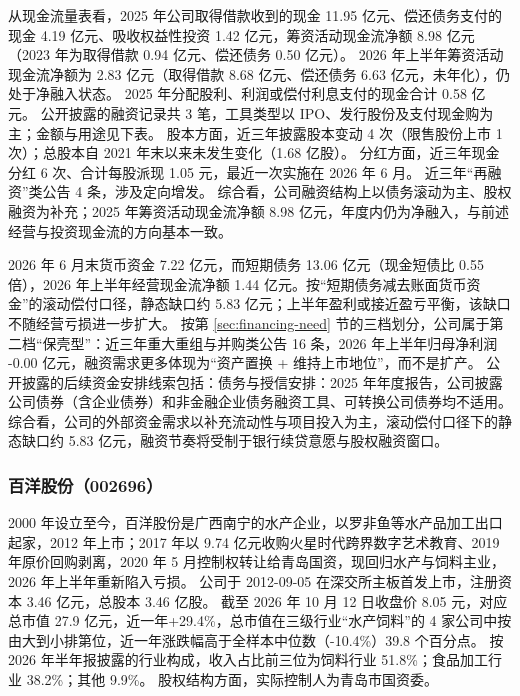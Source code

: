  从现金流量表看，2025 年公司取得借款收到的现金 11.95 亿元、偿还债务支付的现金 4.19 亿元、吸收权益性投资 1.42 亿元，筹资活动现金流净额 8.98 亿元（2023 年为取得借款 0.94 亿元、偿还债务 0.50 亿元）。 2026 年上半年筹资活动现金流净额为 2.83 亿元（取得借款 8.68 亿元、偿还债务 6.63 亿元，未年化），仍处于净融入状态。 2025 年分配股利、利润或偿付利息支付的现金合计 0.58 亿元。 公开披露的融资记录共 3 笔，工具类型以 IPO、发行股份及支付现金购为主；金额与用途见下表。 股本方面，近三年披露股本变动 4 次（限售股份上市 1 次）；总股本自 2021 年末以来未发生变化（1.68 亿股）。 分红方面，近三年现金分红 6 次、合计每股派现 1.05 元，最近一次实施在 2026 年 6 月。 近三年“再融资”类公告 4 条，涉及定向增发。 综合看，公司融资结构上以债务滚动为主、股权融资为补充；2025 年筹资活动现金流净额 8.98 亿元，年度内仍为净融入，与前述经营与投资现金流的方向基本一致。

 2026 年 6 月末货币资金 7.22 亿元，而短期债务 13.06 亿元（现金短债比 0.55 倍），2026 年上半年经营现金流净额 1.44 亿元。按“短期债务减去账面货币资金”的滚动偿付口径，静态缺口约 5.83 亿元；上半年盈利或接近盈亏平衡，该缺口不随经营亏损进一步扩大。 按第 \ref{sec:financing-need} 节的三档划分，公司属于第二档“保壳型”：近三年重大重组与并购类公告 16 条，2026 年上半年归母净利润 -0.00 亿元，融资需求更多体现为“资产置换 + 维持上市地位”，而不是扩产。 公开披露的后续资金安排线索包括：债务与授信安排：2025 年年度报告，公司披露公司债券（含企业债券）和非金融企业债务融资工具、可转换公司债券均不适用。 综合看，公司的外部资金需求以补充流动性与项目投入为主，滚动偿付口径下的静态缺口约 5.83 亿元，融资节奏将受制于银行续贷意愿与股权融资窗口。




\subsubsection{百洋股份（002696）}
\label{co:002696}

 2000 年设立至今，百洋股份是广西南宁的水产企业，以罗非鱼等水产品加工出口起家，2012 年上市；2017 年以 9.74 亿元收购火星时代跨界数字艺术教育、2019 年原价回购剥离，2020 年 5 月控制权转让给青岛国资，现回归水产与饲料主业，2026 年上半年重新陷入亏损。 公司于 2012-09-05 在深交所主板首发上市，注册资本 3.46 亿元，总股本 3.46 亿股。 截至 2026 年 10 月 12 日收盘价 8.05 元，对应总市值 27.9 亿元，近一年+29.4\%，总市值在三级行业“水产饲料”的 4 家公司中按由大到小排第位，近一年涨跌幅高于全样本中位数（-10.4\%）39.8 个百分点。 按 2026 年半年报披露的行业构成，收入占比前三位为饲料行业 51.8\%；食品加工行业 38.2\%；其他 9.9\%。 股权结构方面，实际控制人为青岛市国资委。

